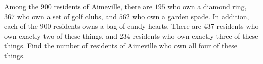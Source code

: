 Among the $900$ residents of Aimeville, there are $195$ who own a diamond ring, $367$ who own a set of golf clubs, and $562$ who own a garden spade. In addition, each of the $900$ residents owns a bag of candy hearts. There are $437$ residents who own exactly two of these things, and $234$ residents who own exactly three of these things. Find the number of residents of Aimeville who own all four of these things.
